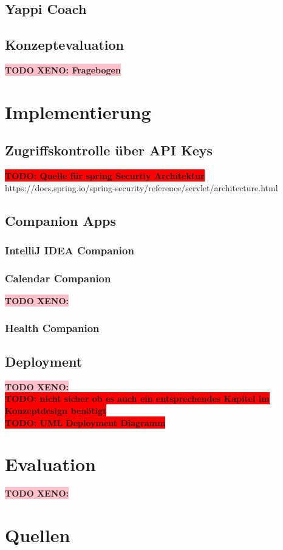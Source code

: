 \documentclass[12pt,a4paper]{report}
\newcommand{\todo}[1]{\colorbox{red}{\textbf{TODO: #1}}\\}
\newcommand{\xeno}[1]{\colorbox{pink}{\textbf{TODO XENO: #1}}\\}
\begin{document}
\section{Yappi Coach}
\section{Konzeptevaluation}
\xeno{Fragebogen}

\chapter{Implementierung}
\section{Zugriffskontrolle über API Keys}

\todo{Quelle für spring Securtiy Architektur}
https://docs.spring.io/spring-security/reference/servlet/architecture.html

\section{Companion Apps}
\subsection{IntelliJ IDEA Companion}
\subsection{Calendar Companion}
\xeno{}
\subsection{Health Companion}
\section{Deployment}
\xeno{}
\todo{nicht sicher ob es auch ein entsprechendes Kapitel im Konzeptdesign benötigt}
\todo{UML Deployment Diagramm}

\chapter{Evaluation}
\xeno{}

\chapter{Quellen}
\end{document}
